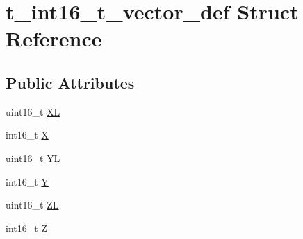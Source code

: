 \hypertarget{structt__int16__t__vector__def}{\section{t\-\_\-int16\-\_\-t\-\_\-vector\-\_\-def Struct Reference}
\label{structt__int16__t__vector__def}
}
\subsection*{Public Attributes}
\begin{DoxyCompactItemize}
\item 
uint16\-\_\-t \hyperlink{structt__int16__t__vector__def_a2c120ad0383e122823efe213b13ab5cc}{X\-L}
\item 
int16\-\_\-t \hyperlink{structt__int16__t__vector__def_a61cf2a446e1ae08aeb0c7ace824a82ec}{X}
\item 
uint16\-\_\-t \hyperlink{structt__int16__t__vector__def_a66854ffc75797f58f7d5d4e0d763de23}{Y\-L}
\item 
int16\-\_\-t \hyperlink{structt__int16__t__vector__def_af2ec520f8476926d16668492e6a040e7}{Y}
\item 
uint16\-\_\-t \hyperlink{structt__int16__t__vector__def_a5030c7e874783efe3111fba34a4ed9a1}{Z\-L}
\item 
int16\-\_\-t \hyperlink{structt__int16__t__vector__def_a02931cf5b5f1e894121140a3f8841e3c}{Z}
\end{DoxyCompactItemize}


